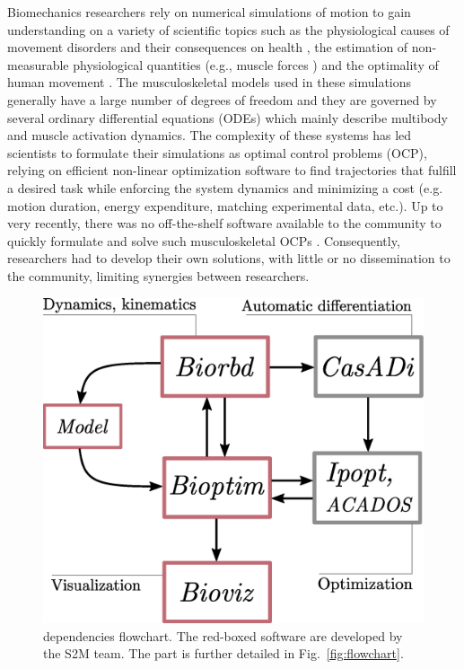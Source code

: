 Biomechanics researchers rely on numerical simulations of motion to gain understanding on a variety of scientific topics such as the physiological causes of movement disorders and their consequences on health \cite{pizzolato2015ceinms}, the estimation of non-measurable physiological quantities (e.g., muscle forces \cite{bailly2020real}) and the optimality of human movement \cite{porsa2016direct}.
The musculoskeletal models used in these simulations generally have a large number of degrees of freedom and they are governed by several ordinary differential equations (ODEs) which mainly describe multibody and muscle activation dynamics.
The complexity of these systems has led scientists to formulate their simulations as optimal control problems (OCP), relying on efficient non-linear optimization software to find trajectories that fulfill a desired task while enforcing the system dynamics and minimizing a cost (e.g. motion duration, energy expenditure, matching experimental data, etc.).
Up to very recently, there was no off-the-shelf software available to the community to quickly formulate and solve such musculoskeletal OCPs \cite{Charles2013}. 
Consequently, researchers had to develop their own solutions, with little or no dissemination to the community, limiting  synergies between researchers.
\begin{figure}[t!]
\centering
\includegraphics[width=0.9\columnwidth]{figures/dependencies.eps}
\caption{\bioptim dependencies flowchart. The red-boxed software are developed by the S2M team. The \bioptim part is further detailed in Fig.~\ref{fig:flowchart}.}
\label{fig:dependencies}
\vspace*{-0.8cm}
\end{figure}

